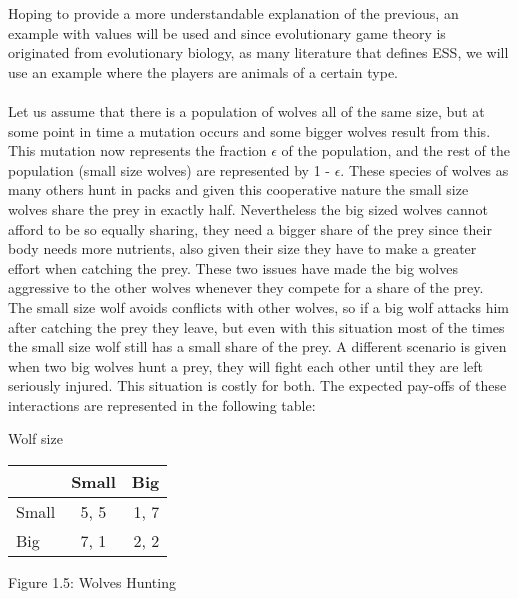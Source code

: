 \documentclass{article}
\begin{document}
Hoping to provide a more understandable explanation of the previous, an example with values will be used and since evolutionary game theory is originated from evolutionary biology, as many literature that defines ESS, we will use an example where the players are animals of a certain type.
\\\\Let us assume that there is a population of wolves all of the same size, but at some point in time a mutation occurs and some bigger wolves result from this. This mutation now represents the fraction $\epsilon$ of the population, and the rest of the population (small size wolves) are represented by 1 - $\epsilon$. These species of wolves as many others hunt in packs and given this cooperative nature the small size wolves share the prey in exactly half. Nevertheless the big sized wolves cannot afford to be so equally sharing, they need a bigger share of the prey since their body needs more nutrients, also given their size they have to make a greater effort when catching the prey. These two issues have made the big wolves aggressive to the other wolves whenever they compete for a share of the prey. The small size wolf avoids conflicts with other wolves, so if a big wolf attacks him after catching the prey they leave, but even with this situation most of the times the small size wolf still has a small share of the prey. A different scenario is given when two big wolves hunt a prey, they will fight each other until they are left seriously injured. This situation is costly for both. The expected pay-offs of these interactions are represented in the following table:
\begin{center}
Wolf size

\begin{tabular}{|l|c|r|}
\hline
 & Small & Big \\ 
\hline
Small & 5, 5 & 1, 7\\
\hline
 Big & 7, 1 & 2, 2\\
\hline
\end{tabular}
\end{center}
\begin{center}
	Figure 1.5: Wolves Hunting
\end{center}
\end{document}
